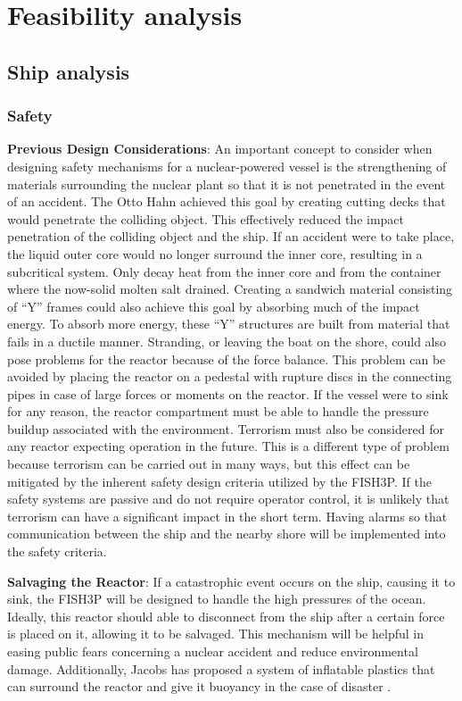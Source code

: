 \documentclass[12pt]{article}
\begin{document}
\section{Feasibility analysis}
\subsection{Ship analysis}
\subsubsection{Safety}

\item \textbf{Previous Design Considerations}: \newline
An important concept to consider when designing safety mechanisms for a nuclear-powered vessel is the strengthening of materials surrounding the nuclear plant so that it is not penetrated in the event of an accident.  The Otto Hahn achieved this goal by creating cutting decks that would penetrate the colliding object.  This effectively reduced the impact penetration of the colliding object and the ship.  If an accident were to take place, the liquid outer core would no longer surround the inner core, resulting in a subcritical system.  Only decay heat from the inner core and from the container where the now-solid molten salt drained.  Creating a sandwich material consisting of “Y” frames could also achieve this goal by absorbing much of the impact energy.  To absorb more energy, these “Y” structures are built from material that fails in a ductile manner.  Stranding, or leaving the boat on the shore, could also pose problems for the reactor because of the force balance.  This problem can be avoided by placing the reactor on a pedestal with rupture discs in the connecting pipes in case of large forces or moments on the reactor.  If the vessel were to sink for any reason, the reactor compartment must be able to handle the pressure buildup associated with the environment.  Terrorism must also be considered for any reactor expecting operation in the future.  This is a different type of problem because terrorism can be carried out in many ways, but this effect can be mitigated by the inherent safety design criteria utilized by the FISH3P.  If the safety systems are passive and do not require operator control, it is unlikely that terrorism can have a significant impact in the short term.  Having alarms so that communication between the ship and the nearby shore will be implemented into the safety criteria.
\item \textbf{Salvaging the Reactor}: \newline
If a catastrophic event occurs on the ship, causing it to sink, the FISH3P will be designed to handle the high pressures of the ocean.  Ideally, this reactor should able to disconnect from the ship after a certain force is placed on it, allowing it to be salvaged.  This mechanism will be helpful in easing public fears concerning a nuclear accident and reduce environmental damage. Additionally, Jacobs has proposed a system of inflatable plastics that can surround the reactor and give it buoyancy in the case of disaster \cite{Jacobs}.
\end{document}

